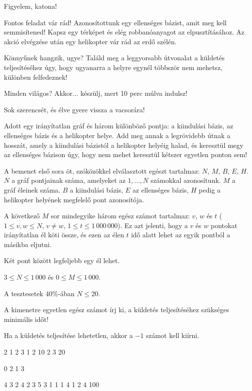 





\noindent
Figyelem, katona!

\bigskip \noindent
Fontos feladat vár rád! Azonosítottunk egy ellenséges bázist, amit meg kell semmisítened! Kapsz egy térképet és elég robbanóanyagot az elpusztításához. Az akció elvégzése után egy helikopter vár rád az erdő szélén.

\bigskip \noindent
Könnyűnek hangzik, ugye? Találd meg a leggyorsabb útvonalat a küldetés teljesítéséhez úgy, hogy ugyanarra a helyre egynél többször nem mehetsz, különben felfedeznek!

\bigskip \noindent
Minden világos? Akkor... készülj, mert 10 perc múlva indulsz!

\bigskip \noindent
Sok szerencsét, és élve gyere vissza a vacsorára!

Adott egy irányítatlan gráf és három különböző pontja: a kiindulási bázis, az ellenséges bázis és a helikopter helye. Add meg annak a legrövidebb útnak a hosszát, amely a kiindulási bázistól a helikopter helyéig halad, és keresztül megy az ellenséges bázison úgy, hogy nem mehet keresztül kétszer egyetlen ponton sem!

A bemenet első sora öt, szóközökkel elválasztott egészt tartalmaz: $N$, $M$, $B$, $E$, $H$. $N$ a gráf pontjainak száma, amelyeket az $1, \ldots, N$ számokkal azonosítunk. $M$ a gráf éleinek száma. $B$ a kiindulási bázis, $E$ az ellenséges bázis, $H$ pedig a helikopter helyének megfelelő pont azonosítója.

A következő $M$ sor mindegyike három egész számot tartalmaz: $v$, $w$ és $t$ ($1 \le v, w \le N$, $v \neq w$, $1 \le t \le 1\,000\,000$). Ez azt jelenti, hogy a $v$ és $w$ pontokat irányítatlan él köti össze, és ezen az élen $t$ idő alatt lehet az egyik pontból a másikba eljutni.

Két pont között legfeljebb egy él lehet.

$3 \le N \le 1\,000$ és $0 \le M \le 1\,000$.

A tesztesetek $40\%$-ában $N\le 20$.

A kimenetre egyetlen egész számot írj ki, a küldetés teljesítéséhez szükséges minimális időt! 

Ha a küldetés teljesítése lehetetlen, akkor a $-1$ számot kell kiírni.


 2 1 2 3
1 2 10
2 3 20
\sampleEND


\bigskip


 0 2 1 3
\sampleEND


\bigskip


 4 3 2 4
2 3 5
3 1 1
1 4 1
2 4 100
\sampleEND


